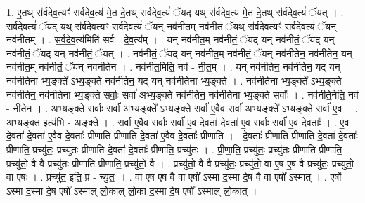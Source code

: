 \documentclass[17pt]{extarticle}
\begin{document}
1. ए॒तथ् स॑र्वदेव॒त्यꣳ॑ सर्वदेव॒त्य॑ मे॒त दे॒तथ् स॑र्वदेव॒त्यं॑ ॅयद् यथ् स॑र्वदेव॒त्य॑ मे॒त दे॒तथ् स॑र्वदेव॒त्यं॑ ॅयत् । . स॒र्व॒दे॒व॒त्यं॑ ॅयद् यथ् स॑र्वदेव॒त्यꣳ॑ सर्वदेव॒त्यं॑ ॅयन् नव॑नीत॒म् नव॑नीतं॒ ॅयथ् स॑र्वदेव॒त्यꣳ॑ सर्वदेव॒त्यं॑ ॅयन् नव॑नीतम् । . स॒र्व॒दे॒व॒त्य॑मिति॑ सर्व - दे॒व॒त्य᳚म् । . यन् नव॑नीत॒म् नव॑नीतं॒ ॅयद् यन् नव॑नीतं॒ ॅयद् यन् नव॑नीतं॒ ॅयद् यन् नव॑नीतं॒ ॅयत् । . नव॑नीतं॒ ॅयद् यन् नव॑नीत॒म् नव॑नीतं॒ ॅयन् नव॑नीतेन॒ नव॑नीतेन॒ यन् नव॑नीत॒म् नव॑नीतं॒ ॅयन् नव॑नीतेन । . नव॑नीत॒मिति॒ नव॑ - नी॒त॒म् । . यन् नव॑नीतेन॒ नव॑नीतेन॒ यद् यन् नव॑नीतेना भ्य॒ङ्क्ते᳚ ऽभ्य॒ङ्क्ते नव॑नीतेन॒ यद् यन् नव॑नीतेना भ्य॒ङ्क्ते । . नव॑नीतेना भ्य॒ङ्क्ते᳚ ऽभ्य॒ङ्क्ते नव॑नीतेन॒ नव॑नीतेना भ्य॒ङ्क्ते सर्वाः॒ सर्वा॑ अभ्य॒ङ्क्ते नव॑नीतेन॒ नव॑नीतेना भ्य॒ङ्क्ते सर्वाः᳚ । . नव॑नीते॒नेति॒ नव॑ - नी॒ते॒न॒ । . अ॒भ्य॒ङ्क्ते सर्वाः॒ सर्वा॑ अभ्य॒ङ्क्ते᳚ ऽभ्य॒ङ्क्ते सर्वा॑ ए॒वैव सर्वा॑ अभ्य॒ङ्क्ते᳚ ऽभ्य॒ङ्क्ते सर्वा॑ ए॒व । . अ॒भ्य॒ङ्क्त इत्य॑भि - अ॒ङ्क्ते । . सर्वा॑ ए॒वैव सर्वाः॒ सर्वा॑ ए॒व दे॒वता॑ दे॒वता॑ ए॒व सर्वाः॒ सर्वा॑ ए॒व दे॒वताः᳚ । . ए॒व दे॒वता॑ दे॒वता॑ ए॒वैव दे॒वताः᳚ प्रीणाति प्रीणाति दे॒वता॑ ए॒वैव दे॒वताः᳚ प्रीणाति । . दे॒वताः᳚ प्रीणाति प्रीणाति दे॒वता॑ दे॒वताः᳚ प्रीणाति॒ प्रच्यु॑तः॒ प्रच्यु॑तः प्रीणाति दे॒वता॑ दे॒वताः᳚ प्रीणाति॒ प्रच्यु॑तः । . प्री॒णा॒ति॒ प्रच्यु॑तः॒ प्रच्यु॑तः प्रीणाति प्रीणाति॒ प्रच्यु॑तो॒ वै वै प्रच्यु॑तः प्रीणाति प्रीणाति॒ प्रच्यु॑तो॒ वै । . प्रच्यु॑तो॒ वै वै प्रच्यु॑तः॒ प्रच्यु॑तो॒ वा ए॒ष ए॒ष वै प्रच्यु॑तः॒ प्रच्यु॑तो॒ वा ए॒षः । . प्रच्यु॑त॒ इति॒ प्र - च्यु॒तः॒ । . वा ए॒ष ए॒ष वै वा ए॒षो᳚ ऽस्मा द॒स्मा दे॒ष वै वा ए॒षो᳚ ऽस्मात् । . ए॒षो᳚ ऽस्मा द॒स्मा दे॒ष ए॒षो᳚ ऽस्माल् लो॒काल् लो॒का द॒स्मा दे॒ष ए॒षो᳚ ऽस्माल् लो॒कात् । \newline
\end{document}
